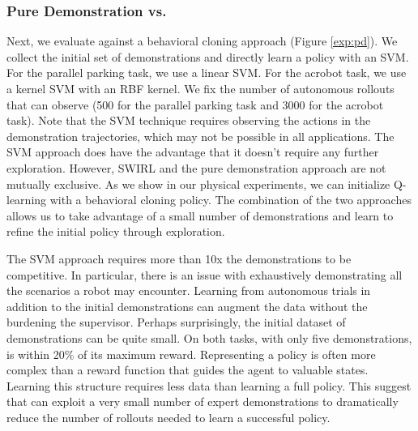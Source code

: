 \subsubsection{Pure Demonstration vs. \hirl}
Next, we evaluate \hirl against a behavioral cloning approach  (Figure \ref{exp:pd}). We collect the initial set of demonstrations and directly learn a policy with an SVM. For the parallel parking task, we use a linear SVM. For the acrobot task, we use a kernel SVM with an RBF kernel. We fix the number of autonomous rollouts that \hirl can observe (500 for the parallel parking task and 3000 for the acrobot task). Note that the SVM technique requires observing the actions in the demonstration trajectories, which may not be possible in all applications. The SVM approach does have the advantage that it doesn't require any further exploration.
However, SWIRL and the pure demonstration approach are not mutually exclusive. 
As we show in our physical experiments, we can initialize Q-learning with a behavioral cloning policy. 
The combination of the two approaches allows us to take advantage of a small number of demonstrations and learn to refine the initial policy through exploration.


The SVM approach requires more than 10x the demonstrations to be competitive.
In particular, there is an issue with exhaustively demonstrating all the scenarios a robot may encounter. 
Learning from autonomous trials in addition to the initial demonstrations can augment the data without the burdening the supervisor.
Perhaps surprisingly, the initial dataset of demonstrations can be quite small.
On both tasks, with only five demonstrations, \hirl is within 20\% of its maximum reward. Representing a policy is often more complex than a reward function that guides the agent to valuable states. 
Learning this structure requires less data than learning a full policy.
This suggest that \hirl can exploit a very small number of expert demonstrations to dramatically reduce the number of rollouts needed to learn a successful policy.

